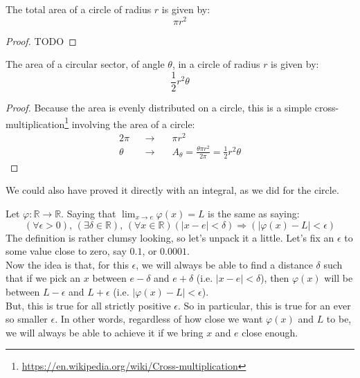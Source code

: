 \documentclass[solutions.tex]{subfiles}
\begin{document}
\begin{theorem} The total area of a circle of
radius $r$ is given by:
\[ \boxed{\pi r^2} \]
\end{theorem}
\begin{proof}
TODO
\end{proof}

\begin{theorem} The area of a circular
sector, of angle $\theta$, in a circle of radius $r$ is given
by:
\[ \boxed{\frac12r^2\theta} \]
\end{theorem}
\begin{proof} Because the area is evenly distributed on a circle,
this is a simple cross-multiplication\footnote{
\url{https://en.wikipedia.org/wiki/Cross-multiplication}} involving
the area of a circle:
\begin{equation*} \begin{aligned}
	2\pi &&\rightarrow\quad& \pi r^2 \\
	\theta &&\rightarrow\quad& A_\theta= \frac{\theta\pi r^2}{2\pi}
		= \boxed{\frac12r^2\theta}
\end{aligned} \end{equation*}
\end{proof}
\begin{remark} We could also have proved it directly with an integral,
as we did for the circle.
\end{remark}

\begin{definition}
Let $\varphi : \mathbb{R} \rightarrow \mathbb{R}$.
Saying that $\lim_{x\rightarrow e}\varphi(x) = L$ is the same as saying:
\[
	(\forall \epsilon > 0),\,(\exists \delta \in \mathbb{R}),\,
	(\forall x \in \mathbb{R}) \left(|x-e| < \delta\right)
		\Rightarrow \left(|\varphi(x)-L| < \epsilon\right)
\]
The definition is rather clumsy looking, so let's unpack it a little.
Let's fix an $\epsilon$ to some value close to zero, say $0.1$, or $0.0001$. \\

Now the idea is that, for this $\epsilon$, we will always be able to
find a distance $\delta$ such that if we pick an $x$ between
$e-\delta$ and $e+\delta$ (i.e. $|x-e| < \delta$), then $\varphi(x)$
will be between $L-\epsilon$ and $L+\epsilon$
(i.e. $|\varphi(x)-L| < \epsilon$). \\

But, this is true for all strictly positive $\epsilon$. So in particular,
this is true for an ever so smaller $\epsilon$. In other words, regardless
of how close we want $\varphi(x)$ and $L$ to be, we will always be
able to achieve it if we bring $x$ and $e$ close enough.

\end{definition}
\end{document}
